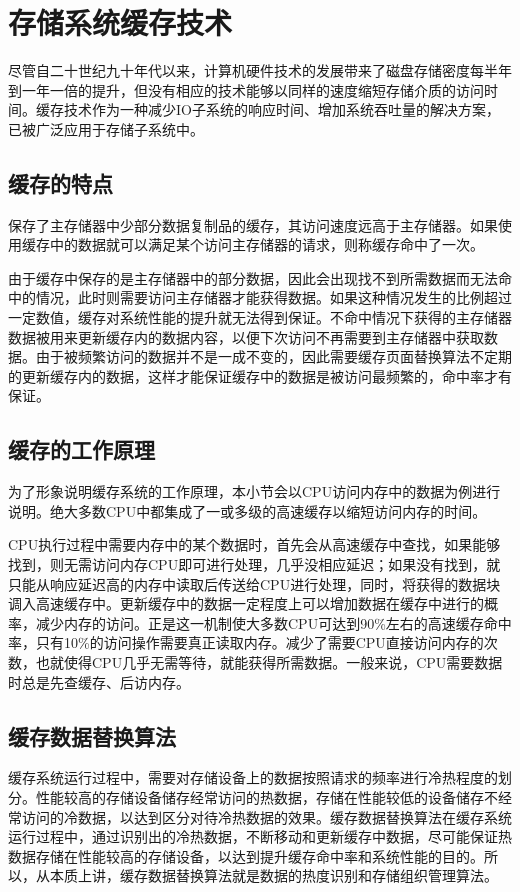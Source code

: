 \section{存储系统缓存技术}
\label{sec:storage_cache_tech}

尽管自二十世纪九十年代以来，计算机硬件技术的发展带来了磁盘存储密度每半年到一年一倍的提升，但没有相应的技术能够以同样的速度缩短存储介质的访问时间。缓存技术\cite{cache2011}作为一种减少IO子系统的响应时间、增加系统吞吐量的解决方案，已被广泛应用于存储子系统中。

\subsection{缓存的特点}
保存了主存储器中少部分数据复制品的缓存，其访问速度远高于主存储器。如果使用缓存中的数据就可以满足某个访问主存储器的请求，则称缓存命中了一次。

由于缓存中保存的是主存储器中的部分数据，因此会出现找不到所需数据而无法命中的情况，此时则需要访问主存储器才能获得数据。如果这种情况发生的比例超过一定数值，缓存对系统性能的提升就无法得到保证。不命中情况下获得的主存储器数据被用来更新缓存内的数据内容，以便下次访问不再需要到主存储器中获取数据。由于被频繁访问的数据并不是一成不变的，因此需要缓存页面替换算法不定期的更新缓存内的数据，这样才能保证缓存中的数据是被访问最频繁的，命中率才有保证。

\subsection{缓存的工作原理}
为了形象说明缓存系统的工作原理，本小节会以CPU访问内存中的数据为例进行说明。绝大多数CPU中都集成了一或多级的高速缓存以缩短访问内存的时间。

CPU执行过程中需要内存中的某个数据时，首先会从高速缓存中查找，如果能够找到，则无需访问内存CPU即可进行处理，几乎没相应延迟；如果没有找到，就只能从响应延迟高的内存中读取后传送给CPU进行处理，同时，将获得的数据块调入高速缓存中。更新缓存中的数据一定程度上可以增加数据在缓存中进行的概率，减少内存的访问。正是这一机制使大多数CPU可达到90\%左右的高速缓存命中率，只有10\%的访问操作需要真正读取内存。减少了需要CPU直接访问内存的次数，也就使得CPU几乎无需等待，就能获得所需数据。一般来说，CPU需要数据时总是先查缓存、后访内存。

\subsection{缓存数据替换算法}
缓存系统运行过程中，需要对存储设备上的数据按照请求的频率进行冷热程度的划分。性能较高的存储设备储存经常访问的热数据，存储在性能较低的设备储存不经常访问的冷数据，以达到区分对待冷热数据的效果。缓存数据替换算法在缓存系统运行过程中，通过识别出的冷热数据，不断移动和更新缓存中数据，尽可能保证热数据存储在性能较高的存储设备，以达到提升缓存命中率和系统性能的目的。所以，从本质上讲，缓存数据替换算法就是数据的热度识别和存储组织管理算法。

